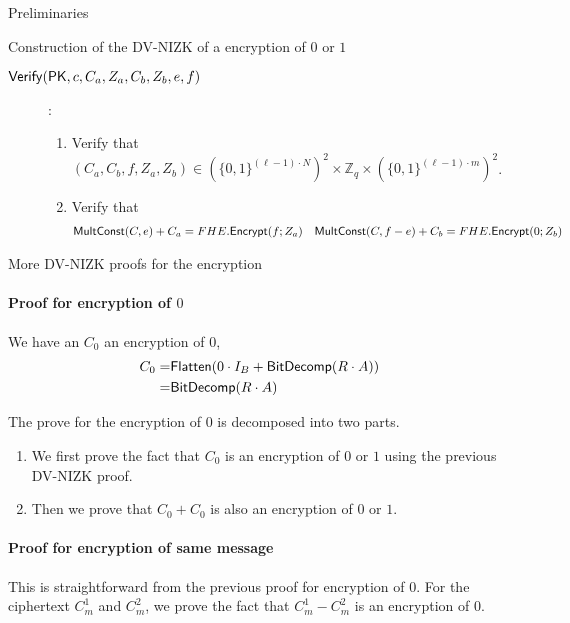 \begin{section}{Preliminaries}
\begin{subsection}{Construction of the DV-NIZK of a encryption of $0$ or $1$}
\begin{description}
    \item[${\mathsf{Verify}}(\mathsf{PK}, c, C_a, Z_a, C_b, Z_b, e, f)$]:
      \begin{enumerate}
      \item Verify that $(C_a, C_b, f, Z_a, Z_b) \in (\{0,1\}^{(\ell-1) \cdot N})^2 \times \mathbb{Z}_q \times (\{0,1\}^{(\ell-1)\cdot m})^2$.
      \item Verify that
        \begin{align*}
          {\mathsf{MultConst}}(C, e)+C_a &= FHE.{\mathsf{Encrypt}}(f; Z_a) & {\mathsf{MultConst}}(C, f-e) + C_b &= FHE.{\mathsf{Encrypt}}(0; Z_b)
        \end{align*}
      \end{enumerate}
    \end{description}
    
    
  \end{subsection}


  \begin{subsection}{More DV-NIZK proofs for the encryption}
    
    \paragraph{Proof for encryption of $0$}
    We have an $C_0$ an encryption of $0$, 
    \begin{align*}
      C_0  = & {\mathsf{Flatten}}( 0 \cdot I_B + {\mathsf{BitDecomp}}(R \cdot A))\\
      = & {\mathsf{BitDecomp}}(R \cdot A)
    \end{align*}

    The prove for the encryption of $0$ is decomposed into two parts.
    \begin{enumerate}
    \item We first prove the fact that $C_0$ is an encryption of $0$ or $1$ using the previous DV-NIZK proof.
    \item Then we prove that $C_0 + C_0$ is also an encryption of $0$ or $1$.
    \end{enumerate}

    \paragraph{Proof for encryption of same message}
    This is straightforward from the previous proof for encryption of $0$. For the ciphertext $C_m^1$ and $C_m^2$, we prove the fact that $C_m^1 - C_m^2$ is an encryption of $0$.

    
  \end{subsection}



\end{section}
